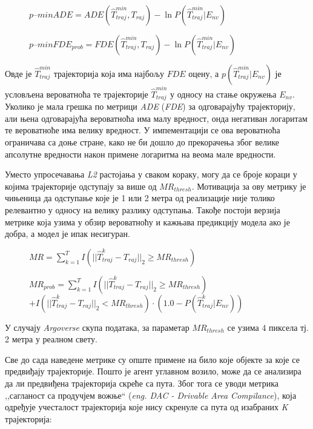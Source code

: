 \documentclass[11pt,oneside]{memoir}
\begin{document}
\begin{figure}[H]
  \centering
  $p\mbox{--}minADE = ADE(\hat{T}^{min}_{traj}, T_{raj}) - \ln{P(\hat{T}^{min}_{traj}|E_{nv})}$
\end{figure}

\begin{figure}[H]
  \centering
  $p\mbox{--}minFDE_{prob} = FDE(\hat{T}^{min}_{traj}, T_{raj}) - \ln{P(\hat{T}^{min}_{traj}|E_{nv})}$
\end{figure}

Овде је $\hat{T}^{min}_{traj}$ трајекторија која има најбољу $FDE$ оцену, а $p(\hat{T}^{min}_{traj}|E_{nv})$ је условљена вероватноћа те 
трајекторије $\hat{T}^{min}_{traj}$ у односу на стање окружења $E_{nv}$. Уколико је мала грешка по метрици \textit{ADE} (\textit{FDE}) за одговарајућу трајекторију, 
али њена одговарајућа вероватноћа има малу вредност, онда негативан логаритам те вероватноће има велику вредност. 
\cite{argoverse} У импементацији се ова вероватноћа ограничава са доње стране, како не
би дошло до прекорачења због велике апсолутне вредности након примене логаритма на веома мале вредности.

Уместо упросечавања \textit{L2} растојања у сваком кораку, могу да се броје кораци у којима трајекторије одступају за више од $MR_{thresh}$. 
Мотивација за ову метрику је чињеница да одступање које је 1 или 2 метра од реализације није толико релевантно у односу на 
велику разлику одступања. \cite{home} Такође постоји верзија метрике која узима у обзир вероватноћу и кажњава предикцију 
модела ако је добра, а модел је ипак несигуран.

\begin{figure}[H]
  \centering
  $MR = \sum^T_{k=1} I(||\hat{T}^{k}_{traj} - T_{raj}||_{2} \geq MR_{thresh})$
\end{figure}

\begin{figure}[H]
  \centering
  $MR_{prob} = \sum^T_{k=1} I(||\hat{T}^{k}_{traj} - T_{raj}||_{2} \geq MR_{thresh}) $
  $+ I(||\hat{T}^{k}_{traj} - T_{raj}||_{2} < MR_{thresh}) \cdot (1.0 - P(\hat{T}^{k}_{traj}|E_{nv}))$
\end{figure}

\noindent У случају \textit{Argoverse} скупа података, за параметар $MR_{thresh}$ се узима 4 пиксела тј. 2 метра у реалном свету. 

Све до сада наведене метрике су опште примене на било које објекте за које се предвиђају трајекторије. Пошто је агент углавном возило, може да
се анализира да ли предвиђена трајекторија скреће са пута. Због тога се уводи метрика ,,сагланост са продучјем вожње`` 
(\textit{eng. DAC - Drivable Area Compilance}), која одређује учесталост трајекторија које нису скренуле са пута од изабраних 
\textit{K} трајекторија: \cite{argoverse}
\end{document}
